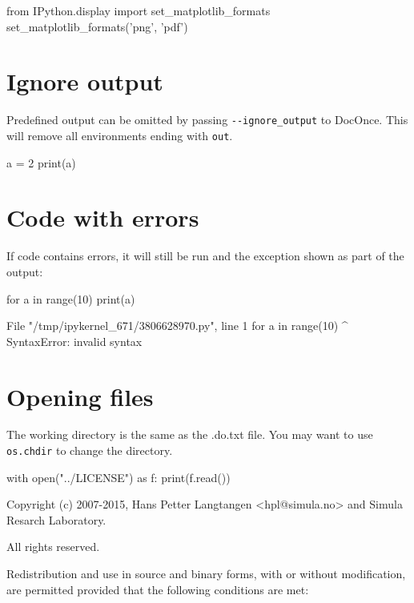 \documentclass[%
oneside,                 %
final,                   %
chapterprefix=true,      %
open=right,              %
10pt]{book}
\begin{document}
\bpycod
from IPython.display import set_matplotlib_formats
set_matplotlib_formats('png', 'pdf')

\epycod


\section{Ignore output}

Predefined output can be omitted by passing \Verb!--ignore_output! to DocOnce.
This will remove all environments ending with \texttt{out}.




\bpycod
a = 2
print(a)

\epycod

\epy




\epy

\epy

\section{Code with errors}

If code contains errors, it will still be run and the exception shown as part
of the output:




\bpycod
for a in range(10)
    print(a)

\epycod

\bpy
  File "/tmp/ipykernel_671/3806628970.py", line 1
    for a in range(10)
                      ^
SyntaxError: invalid syntax
\epy

\section{Opening files}

The working directory is the same as the .do.txt file.
You may want to use \texttt{os.chdir} to change the directory.




\bpycod
with open("../LICENSE") as f:
    print(f.read())

\epycod

\bpy
Copyright (c) 2007-2015, Hans Petter Langtangen <hpl@simula.no> and
Simula Resarch Laboratory.

All rights reserved.

Redistribution and use in source and binary forms, with or without
modification, are permitted provided that the following conditions are
met:
\end{document}

